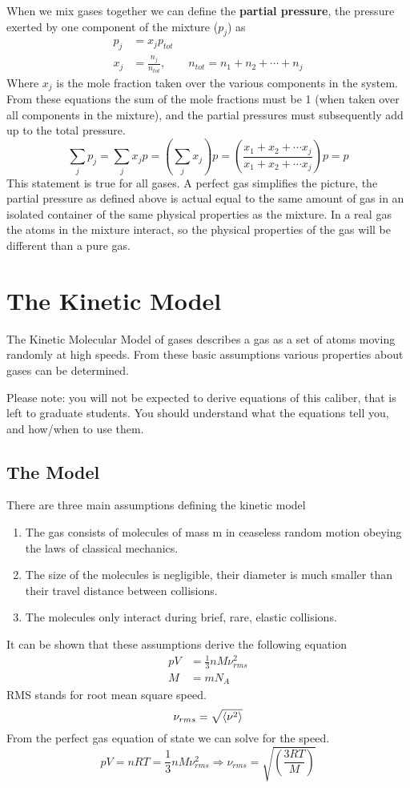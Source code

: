 \documentclass{article}
\newcommand{\be}{\begin{equation}}
\newcommand{\ee}{\end{equation}}
\begin{document}
When we mix gases together we can define the \textbf{partial pressure}, the pressure exerted by one component of the mixture ($p_j$) as 
\be
\begin{split}
p_j &= x_j p_{tot}\\
x_j &= \frac{n_j}{n_{tot}}, \qquad n_{tot} = n_1 + n_2 + \cdots + n_j
\end{split}
\ee
Where $x_j$ is the mole fraction taken over the various components in the system. 
From these equations the sum of the mole fractions must be 1 (when taken over all components in the mixture), and the partial pressures must subsequently add up to the total pressure. 
\be
\sum_j p_j = \sum_j x_j p = \left(\sum_j x_j\right)p = \left( \frac{x_1 + x_2 + \cdots x_j}{x_1 + x_2 + \cdots x_j}\right)p = p
\ee
This statement is true for all gases. 
A perfect gas simplifies the picture, the partial pressure as defined above is actual equal to the same amount of gas in an isolated container of the same physical properties as the mixture. 
In a real gas the atoms in the mixture interact, so the physical properties of the gas will be different than a pure gas.

\section*{The Kinetic Model}
The Kinetic Molecular Model of gases describes a gas as a set of atoms moving randomly at high speeds. 
From these basic assumptions various properties about gases can be determined. 

Please note: you will not be expected to derive equations of this caliber, that is left to graduate students.
You should understand what the equations tell you, and how/when to use them. 

\subsection*{The Model}
There are three main assumptions defining the kinetic model
\begin{enumerate}
\item The gas consists of molecules of mass m in ceaseless random motion obeying the laws of classical mechanics. 
\item The size of the molecules is negligible, their diameter is much smaller than their travel distance between collisions. 
\item The molecules only interact during brief, rare, elastic collisions. 
\end{enumerate}
It can be shown that these assumptions derive the following equation
\be
\begin{split}
pV &= \frac{1}{3}nM\nu_{rms}^2\\
M &= mN_A
\end{split}
\ee
RMS stands for root mean square speed. 
\be
\nu_{rms} = \sqrt{\braket{\nu^2}}
\ee
From the perfect gas equation of state we can solve for the speed. 
\be
pV = nRT = \frac{1}{3}nM\nu_{rms}^2 \Rightarrow \nu_{rms} = \sqrt{\left( \frac{3RT}{M} \right)}
\ee
\end{document}
